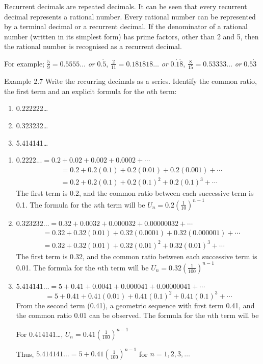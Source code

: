 Recurrent decimals are repeated decimals. It can be seen that every recurrent
decimal represents a rational number. Every rational number can be represented
by a terminal decimal or a recurrent decimal. If the denominator of a rational
number (written in its simplest form) has prime factors, other than 2 and 5, then
the rational number is recognised as a recurrent decimal.

For example; $\frac{5}{9} = 0.5555\ldots$ \textit{or} $0.\dot{5}$,
$\frac{2}{11} = 0.181818\ldots$ \textit{or} $0.\dot{1}\dot{8}$,
$\frac{8}{15} = 0.53333\ldots$ \textit{or} $0.5\dot{3}$

\begin{example}{Example 2.7}
Write the recurring decimals as a series. Identify the common ratio, the first term
and an explicit formula for the $n$th term:
\begin{enumerate}
  \item[a.] 0.222222\ldots
  \item[b.] 0.323232\ldots
  \item[c.] 5.414141\ldots
\end{enumerate}

\solution
\begin{enumerate}
  \item[a.] $0.2222... = 0.2 + 0.02 + 0.002 + 0.0002 + \cdots$
  \begin{align*}
    &= 0.2 + 0.2(0.1) + 0.2(0.01) + 0.2(0.001) + \cdots \\
    &= 0.2 + 0.2(0.1) + 0.2(0.1)^2 + 0.2(0.1)^3 + \cdots
  \end{align*}
  The first term is 0.2, and the common ratio between each successive term is
  0.1. The formula for the $n$th term will be $U_n = 0.2\left(\frac{1}{10}\right)^{n-1}$

  \item[b.] $0.323232\ldots = 0.32 + 0.0032 + 0.000032 + 0.00000032 + \cdots$
  \begin{align*}
    &= 0.32 + 0.32(0.01) + 0.32(0.0001) + 0.32(0.000001) + \cdots \\
    &= 0.32 + 0.32(0.01) + 0.32(0.01)^2 + 0.32(0.01)^3 + \cdots
  \end{align*}
  The first term is 0.32, and the common ratio between each successive term
  is 0.01. The formula for the $n$th term will be $U_n = 0.32\left(\frac{1}{100}\right)^{n-1}$

  \item[c.] $5.414141\ldots = 5 + 0.41 + 0.0041 + 0.000041 + 0.00000041 + \cdots$
  \[
    = 5 + 0.41 + 0.41(0.01) + 0.41(0.1)^2 + 0.41(0.1)^3 + \cdots
  \]
  From the second term (0.41), a geometric sequence with first term 0.41, and
  the common ratio 0.01 can be observed. The formula for the $n$th term will
  be

  For 0.414141\ldots, $U_n = 0.41\left(\frac{1}{100}\right)^{n-1}$

  Thus, $5.414141\ldots = 5 + 0.41\left(\frac{1}{100}\right)^{n-1}$ for $n = 1, 2, 3, \ldots$
\end{enumerate}
\end{example}

